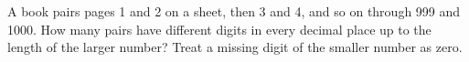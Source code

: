 A book pairs pages 1 and 2 on a sheet, then 3 and 4, and so on through 999 and 1000. How many pairs have different digits in every decimal place up to the length of the larger number? Treat a missing digit of the smaller number as zero.
